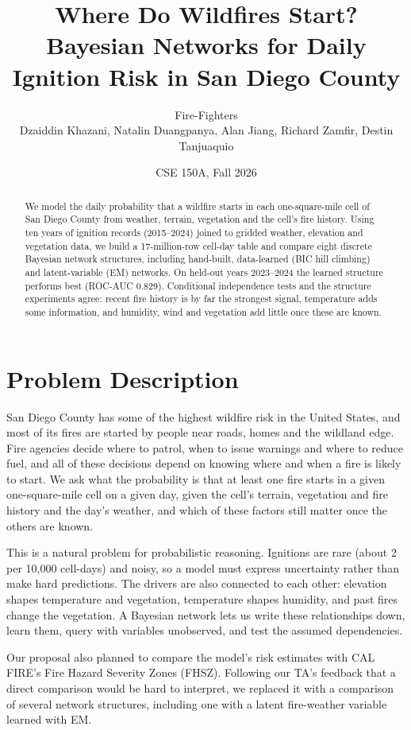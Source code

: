 \documentclass[11pt]{article}
\title{Where Do Wildfires Start? Bayesian Networks for Daily Ignition Risk in San Diego County}
\author{Fire-Fighters \\ Dzaiddin Khazani, Natalin Duangpanya, Alan Jiang, Richard Zamfir, Destin Tanjuaquio}
\date{CSE 150A, Fall 2026}
\begin{document}
\maketitle

\begin{abstract}
We model the daily probability that a wildfire starts in each one-square-mile cell of San Diego
County from weather, terrain, vegetation and the cell's fire history. Using ten years of ignition
records (2015--2024) joined to gridded weather, elevation and vegetation data, we build a
17-million-row cell-day table and compare eight discrete Bayesian network structures, including
hand-built, data-learned (BIC hill climbing) and latent-variable (EM) networks. On held-out years 2023--2024 the learned structure performs best (ROC-AUC
0.829). Conditional independence tests and the structure experiments agree: recent fire history
is by far the strongest signal, temperature adds some information, and humidity, wind and
vegetation add little once these are known.
\end{abstract}

\section{Problem Description}

San Diego County has some of the highest wildfire risk in the United States, and most of its
fires are started by people near roads, homes and the wildland edge. Fire agencies decide where to
patrol, when to issue warnings and where to reduce fuel, and all of these decisions depend on
knowing where and when a fire is likely to start. We ask what the probability is that at least one
fire starts in a given one-square-mile cell on a given day, given the cell's terrain, vegetation
and fire history and the day's weather, and which of these factors still matter once the others
are known.

This is a natural problem for probabilistic reasoning. Ignitions are rare (about 2 per 10,000
cell-days) and noisy, so a model must express uncertainty rather than make hard predictions. The
drivers are also connected to each other: elevation shapes temperature and vegetation, temperature
shapes humidity, and past fires change the vegetation. A Bayesian network lets us write these
relationships down, learn them, query with variables unobserved, and test the assumed dependencies.

Our proposal also planned to compare the model's risk estimates with CAL FIRE's Fire Hazard
Severity Zones (FHSZ). Following our TA's feedback that a direct comparison would be hard to
interpret, we replaced it with a comparison of several network structures, including one with
a latent fire-weather variable learned with EM.
\end{document}
